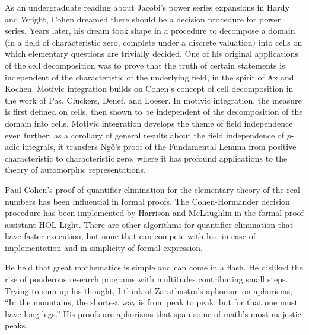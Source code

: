 \documentclass{llncs}
\begin{document}
\smallskip



As an undergraduate reading about Jacobi's power series expansions in Hardy and Wright, Cohen dreamed there should be 
a decision procedure for power series.   Years later, his dream took 
shape in a
procedure to decompose a domain (in a field of characteristic zero, complete under a discrete valuation) into 
cells on which elementary questions are trivially decided.
One of his original applications of the
cell decomposition was to prove that the truth of certain statements is independent of the characteristic of the underlying field, in the spirit of Ax and Kochen.
Motivic integration builds on Cohen's concept of cell decomposition in the work of Pas, Cluckers, Denef, and Loeser.  In motivic integration, the measure is first defined on cells, then shown to be independent of the decomposition of the domain into cells.  
Motivic integration develops the theme of field independence even further: as a corollary of general results about the field independence of $p$-adic integrals, it transfers Ng\^o's proof of the Fundamental Lemma  from positive characteristic to characteristic zero, where it has profound applications to the theory of automorphic representations.

Paul Cohen's proof of quantifier elimination for the elementary theory of the real numbers has been influential
in formal proofs.  The
Cohen-Hormander decision procedure has been implemented by
Harrison and McLaughlin
in the formal proof assistant HOL-Light.  There are other algorithms for
quantifier elimination that have faster execution, but none that can compete with his, in ease of implementation and in simplicity of formal expression. 


He held that great
mathematics is simple and can come in a flash.
He disliked the rise of ponderous research programs with multitudes contributing
small steps.
Trying to sum up his thought, I think of Zarathustra's aphorism on aphorisms, ``In the mountains, the shortest way is from peak to peak: but for that one must have long legs.''  His proofs are aphorisms that span some of math's most
majestic peaks.  
\end{document}
